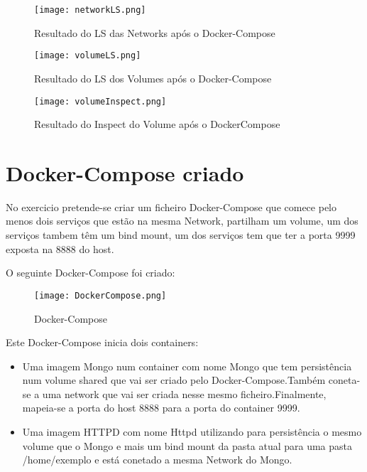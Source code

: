 \begin{figure}[H]

	\centering
	\texttt{[image: networkLS.png]}

 	\caption {Resultado do LS das Networks após o Docker-Compose}

  	\label {fig:ComposeNetLs}
\end{figure}

\begin{figure}[H]

	\centering
	\texttt{[image: volumeLS.png]}

 	\caption {Resultado do LS dos Volumes após o Docker-Compose}

  	\label {fig:ComposeVol}
\end{figure}

\begin{figure}[H]

	\centering
	\texttt{[image: volumeInspect.png]}

 	\caption {Resultado do Inspect do Volume após o DockerCompose}

  	\label {fig:ComposeVolInsp}
\end{figure}

\section{Docker-Compose criado}

No exercicio pretende-se criar um ficheiro Docker-Compose que comece pelo menos dois serviços que estão na mesma Network, partilham um volume, um dos serviços tambem têm um bind mount, um dos serviços tem que ter a porta 9999 exposta na 8888 do host.

O seguinte Docker-Compose foi criado:

\begin{figure}[H]

	\texttt{[image: DockerCompose.png]}
	\centering

 	\caption {Docker-Compose}

  	\label {fig:DocCom}
\end{figure}

Este Docker-Compose inicia dois containers:

\begin{itemize}

\item Uma imagem Mongo num container com nome Mongo que tem persistência num volume shared que vai ser criado pelo Docker-Compose.Também coneta-se a uma network que vai ser criada nesse mesmo ficheiro.Finalmente, mapeia-se a porta do host 8888 para a porta do container 9999.

\item Uma imagem HTTPD com nome Httpd utilizando para persistência o mesmo volume que o Mongo e mais um bind mount da pasta atual para uma pasta /home/exemplo e está conetado a mesma Network do Mongo.

\end{itemize}

